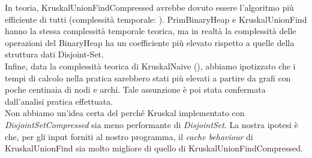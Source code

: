 \noindent In teoria, KruskalUnionFindCompressed avrebbe dovuto essere l'algoritmo più efficiente di tutti (complessità temporale: \complexityMLogN).
\noindent PrimBinaryHeap e KruskalUnionFind hanno la stessa complessità temporale teorica, ma in realtà la complessità delle operazioni del BinaryHeap ha un coefficiente più elevato rispetto a quelle della struttura dati Disjoint-Set. \\

\noindent Infine, data la complessità teorica di KruskalNaive (\complexityMN{}), abbiamo ipotizzato che i tempi di calcolo nella pratica sarebbero stati più elevati a partire da grafi con poche centinaia di nodi e archi. Tale assunzione è poi stata confermata dall'analisi pratica effettuata. \\

\noindent Non abbiamo un'idea certa del perché Kruskal implementato con \textit{DisjointSetCompressed} sia meno performante di \textit{DisjointSet}. La nostra ipotesi è che, per gli input forniti al nostro programma, il \textit{cache behaviour} di KruskalUnionFind sia molto migliore di quello di KruskalUnionFindCompressed.
